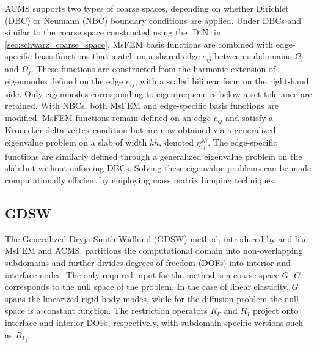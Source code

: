 ACMS supports two types of coarse spaces, depending on whether Dirichlet (DBC) or Neumann (NBC) boundary conditions are applied. Under DBCs and similar to the coarse space constructed using the $\operatorname{DtN}$ in \cref{sec:schwarz_coarse_space}, MsFEM basis functions are combined with edge-specific basis functions that match on a shared edge $e_{ij}$ between subdomains $\Omega_i$ and $\Omega_j$. These functions are constructed from the harmonic extension of eigenmodes defined on the edge $e_{ij}$, with a scaled bilinear form on the right-hand side. Only eigenmodes corresponding to eigenfrequencies below a set tolerance are retained. With NBCs, both MsFEM and edge-specific basis functions are modified. MsFEM functions remain defined on an edge $e_{ij}$ and satisfy a Kronecker-delta vertex condition but are now obtained via a generalized eigenvalue problem on a slab of width $kh$, denoted $\eta^{kh}_{ij}$. The edge-specific functions are similarly defined through a generalized eigenvalue problem on the slab but without enforcing DBCs. Solving these eigenvalue problems can be made computationally efficient by employing mass matrix lumping techniques.

\subsection{GDSW}
The Generalized Dryja-Smith-Widlund (GDSW) method, introduced by \cite{gdsw_coarse_space_Dohrmann2008} and like MsFEM and ACMS, partitions the computational domain into non-overlapping subdomains and further divides degrees of freedom (DOFs) into interior and interface nodes. The only required input for the method is a coarse space $G$. $G$ corresponds to the null space of the problem. In the case of linear elasticity, $G$ spans the linearized rigid body modes, while for the diffusion problem the null space is a constant function. The restriction operators $R_{\Gamma}$ and $R_I$ project onto interface and interior DOFs, respectively, with subdomain-specific versions such as $R_{\Gamma_j}$.


